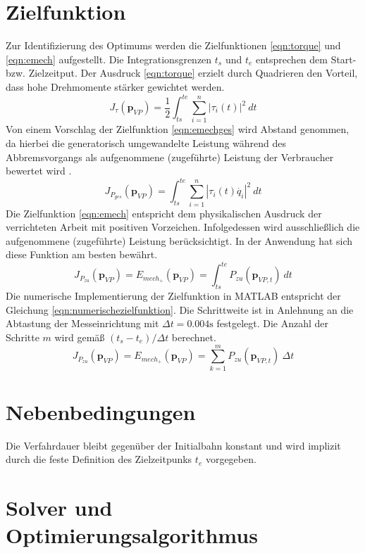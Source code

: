 \section{Zielfunktion}
Zur Identifizierung des Optimums werden die Zielfunktionen \ref{eqn:torque} \cite[S-~1]{Hansen.2012} und \ref{eqn:emech} \cite[S.~57]{Eggers.2019} aufgestellt. Die Integrationsgrenzen $t_s$ und $t_e$ entsprechen dem Start- bzw. Zielzeitput. Der Ausdruck \ref{eqn:torque} erzielt durch Quadrieren den Vorteil, dass hohe Drehmomente stärker gewichtet werden.\textbf{}
%
\begin{equation}
	\label{eqn:torque}
	J_{\tau}(\bm{p}_{VP}) = \frac{1}{2}\int_{ts}^{te}\sum_{i=1}^{n}\left|\tau_i(t)\right|^2~dt
\end{equation}
%
Von einem Vorschlag der Zielfunktion \ref{eqn:emechges} \cite[S.~1216]{Saravanan.2008} wird Abstand genommen, da hierbei die generatorisch umgewandelte Leistung während des Abbremsvorgangs als aufgenommene (zugeführte) Leistung der Verbraucher bewertet wird \cite[S.~1]{Hansen.2012}. 
%
\begin{equation}
	\label{eqn:emechges}
	J_{P_{{ges}}}(\bm{p}_{VP}) = \int_{ts}^{te}\sum_{i=1}^{n}\left|\tau_i(t)\dot{q_i}\right|^2~dt
\end{equation}
%
Die Zielfunktion \ref{eqn:emech} entspricht dem physikalischen Ausdruck der verrichteten Arbeit mit positiven Vorzeichen. Infolgedessen wird ausschließlich die aufgenommene (zugeführte) Leistung berücksichtigt. In der Anwendung hat sich diese Funktion am besten bewährt.
%
\begin{equation}
	\label{eqn:emech}
	J_{P_{zu}}
	(\bm{p}_{VP}) 
	= E_{mech_{+}}(\bm{p}_{VP}) 
	=\int_{ts}^{te}P_{zu}(\bm{p}_{VP,t})~dt
\end{equation}
%
Die numerische Implementierung der Zielfunktion in  MATLAB\textsuperscript{\textregistered} entspricht der Gleichung  \ref{eqn:numerischezielfunktion}. 
Die Schrittweite ist in Anlehnung an die Abtastung der Messeinrichtung  mit $\Delta t = 0.004 \text{s}$ festgelegt. Die Anzahl der Schritte $m$  wird gemäß $(t_s-t_e)/\Delta t$ berechnet.
%
\begin{equation}
	\label{eqn:numerischezielfunktion}
	J_{P_{zu}}
	(\bm{p}_{VP}) 
	= E_{mech_{+}}(\bm{p}_{VP}) 
	= \sum_{k=1}^{m} P_{zu}(\bm{p}_{VP,t})~\Delta t
\end{equation}
%



\section{Nebenbedingungen}
Die Verfahrdauer bleibt gegenüber der Initialbahn konstant und wird implizit durch die feste Definition des Zielzeitpunks $t_e$ vorgegeben. 

\section{Solver und Optimierungsalgorithmus}